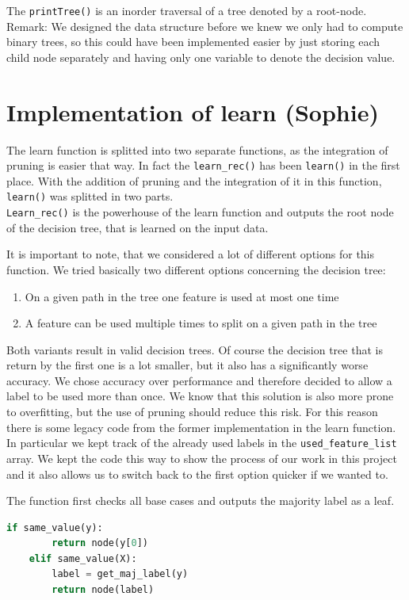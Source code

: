 \documentclass[12pt,a4paper]{scrartcl}		%
\begin{document}
The \texttt{printTree()} is an inorder traversal of a tree denoted by a root-node. \\

Remark: We designed the data structure before we knew we only had to compute binary trees, so this could have 
been implemented easier by just storing each child node separately and having only one variable to denote the 
decision value.

\section{Implementation of learn (Sophie)}
The learn function is splitted into two separate functions, as the integration of pruning is easier that way. 
In fact the \texttt{learn\_rec()} has been \texttt{learn()} in the first place. With the addition of pruning and the integration 
of it in this function, \texttt{learn()} was splitted in two parts.\\

\texttt{Learn\_rec()} is the powerhouse of the learn function and outputs the root node of the decision tree, that is 
learned on the input data. 

It is important to note, that we considered a lot of different options for this function. We tried basically 
two different options concerning the decision tree:
\begin{enumerate}
    \item On a given path in the tree one feature is used at most one time
    \item A feature can be used multiple times to split on a given path in the tree
\end{enumerate}
Both variants result in valid decision trees. Of course the decision tree that is return by the first one is 
a lot smaller, but it also has a significantly worse accuracy. We chose accuracy over performance and 
therefore decided to allow a label to be used more than once. We know that this solution is also more prone 
to overfitting, but the use of pruning should reduce this risk. For this reason there is some 
legacy code from the former implementation in the learn function. In particular we kept track of the already 
used labels in the \texttt{used\_feature\_list} array. We kept the code this way to show the process of our work in this 
project and it also allows us to switch back to the first option quicker if we wanted to.

The function first checks all base cases and outputs the majority label as a leaf.
\begin{lstlisting}[language=Python]
    if same_value(y):
        return node(y[0])
    elif same_value(X):
        label = get_maj_label(y)
        return node(label)
\end{lstlisting}
\end{document}
